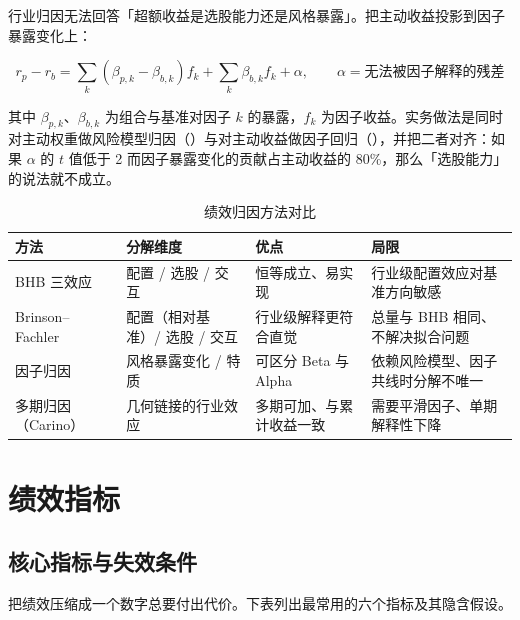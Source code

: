 行业归因无法回答「超额收益是选股能力还是风格暴露」。把主动收益投影到因子暴露变化上：

\begin{equation}\label{eq:11-factor-attr}
  r_p - r_b = \sum_{k}\left(\beta_{p,k} - \beta_{b,k}\right)f_k + \sum_{k}\beta_{b,k}f_k + \alpha,
  \qquad \alpha = \text{无法被因子解释的残差}
\end{equation}

其中 $\beta_{p,k}$、$\beta_{b,k}$ 为组合与基准对因子 $k$ 的暴露，$f_k$ 为因子收益。实务做法是同时对主动权重做风险模型归因（）与对主动收益做因子回归（），并把二者对齐：如果 $\alpha$ 的 $t$ 值低于 2 而因子暴露变化的贡献占主动收益的 80\%，那么「选股能力」的说法就不成立。

\begin{table}[htbp]
\centering
\caption{绩效归因方法对比}\label{tab:11-attrib}
\tablefont
\begin{tabularx}{\textwidth}{@{}L{2.6cm}L{3.4cm}YL{3.4cm}@{}}
\toprule
方法 & 分解维度 & 优点 & 局限 \\
\midrule
BHB 三效应 & 配置 / 选股 / 交互 & 恒等成立、易实现 & 行业级配置效应对基准方向敏感 \\
Brinson--Fachler & 配置（相对基准）/ 选股 / 交互 & 行业级解释更符合直觉 & 总量与 BHB 相同、不解决拟合问题 \\
因子归因 & 风格暴露变化 / 特质 & 可区分 Beta 与 Alpha & 依赖风险模型、因子共线时分解不唯一 \\
多期归因（Carino） & 几何链接的行业效应 & 多期可加、与累计收益一致 & 需要平滑因子、单期解释性下降 \\
\bottomrule
\end{tabularx}
\end{table}

\section{绩效指标}

\subsection{核心指标与失效条件}

把绩效压缩成一个数字总要付出代价。下表列出最常用的六个指标及其隐含假设。

